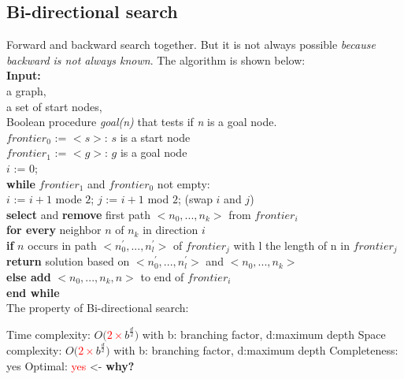\subsection{Bi-directional search}
Forward and backward search together. But it is not always possible \emph{because backward is not always known}. The algorithm is shown below: \\
\textbf{Input:} \\
\tabto{5mm} a graph, \\
\tabto{5mm} a set of start nodes, \\
\tabto{5mm} Boolean procedure \emph{goal(n)} that tests if \emph{n} is a goal node. \\
$frontier_{0}$ := {$<s>$: $s$ is a start node} \\
$frontier_{1}$ := {$<g>$: $g$ is a goal node} \\
$i$ := 0; \\
\textbf{while} $frontier_{1}$ and $frontier_{0}$ not empty: \\
\tabto{5mm} $i$ := $i+1$ mode $2$; $j$ := $i+1$ mod $2$; (swap $i$ and $j$) \\
\tabto{5mm} \textbf{select} and \textbf{remove} first path $<n_{0},...,n_{k}>$ from $frontier_{i}$ \\
\tabto{5mm} \textbf{for every} neighbor $n$ of $n_{k}$ in direction $i$ \\
\tabto{10mm} \textbf{if} $n$ occurs in path $<n^{\prime}_{0},...,n^{\prime}_{l}>$ of $frontier_{j}$ with l the length of n in $frontier_{j}$ \\
\tabto{15mm} \textbf{return} solution based on $<n^{\prime}_{0},...,n^{\prime}_{l}>$ and $<n_{0},...,n_{k}>$ \\
\tabto{10mm} \textbf{else add} $<n_{0},...,n_{k},n>$ to end of $frontier_{i}$ \\
\textbf{end while} \\

\noindent
The property of Bi-directional search:
\begin{outline}
    \1 Time complexity: $O($\textcolor{red}{$2 \times$}$b^{\frac{d}{2}})$
        \2 with b: branching factor, d:maximum depth
    \1 Space complexity: $O($\textcolor{red}{$2 \times$}$b^{\frac{d}{2}})$
        \2 with b: branching factor, d:maximum depth
    \1 Completeness: yes
    \1 Optimal: \textcolor{red}{yes} <- \textbf{why?}
\end{outline}

